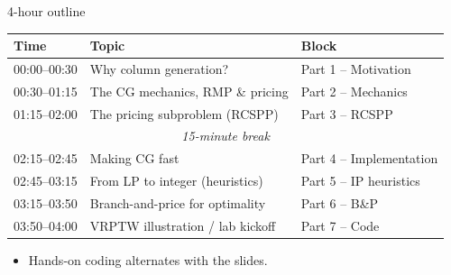 \documentclass[10pt,aspectratio=169]{beamer}
\begin{document}
\begin{frame}{4-hour outline}
  \small
  \begin{tabular}{@{}lll@{}}
    \toprule
    Time & Topic & Block \\
    \midrule
    00:00--00:30 & Why column generation? & Part 1 -- Motivation \\
    00:30--01:15 & The CG mechanics, RMP \& pricing & Part 2 -- Mechanics \\
    01:15--02:00 & The pricing subproblem (RCSPP) & Part 3 -- RCSPP \\
    \midrule
    \multicolumn{3}{c}{\emph{15-minute break}} \\
    \midrule
    02:15--02:45 & Making CG fast & Part 4 -- Implementation \\
    02:45--03:15 & From LP to integer (heuristics) & Part 5 -- IP heuristics \\
    03:15--03:50 & Branch-and-price for optimality & Part 6 -- B\&P \\
    03:50--04:00 & VRPTW illustration / lab kickoff & Part 7 -- Code \\
    \bottomrule
  \end{tabular}
  \vspace{0.5em}
  \begin{itemize}\small
    \item Hands-on coding alternates with the slides.
  \end{itemize}
\end{frame}
\end{document}
